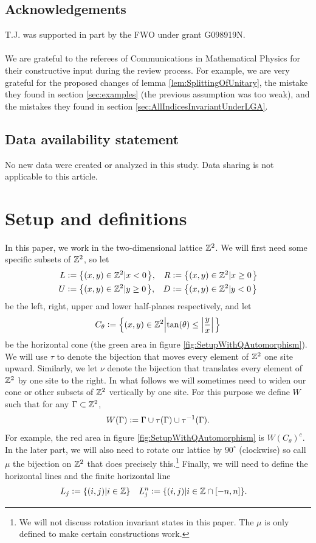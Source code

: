 \documentclass[11pt,a4paper,twoside]{article}
\numberwithin{equation}{section}
\begin{document}
	\subsection*{Acknowledgements}
	T.J. was supported in part by the FWO under grant G098919N.\\\\
	We are grateful to the referees of Communications in Mathematical Physics for their constructive input during the review process. For example, we are very grateful for the proposed changes of lemma \ref{lem:SplittingOfUnitary}, the mistake they found in section \ref{sec:examples} (the previous assumption was too weak), and the mistakes they found in section \ref{sec:AllIndicesInvariantUnderLGA}.
	\subsection*{Data availability statement}
	No new data were created or analyzed in this study. Data sharing is not applicable to this article.
	\section{Setup and definitions}\label{sec:Setup}
	In this paper, we work in the two-dimensional lattice $\mathbb Z^2$. We will first need some specific subsets of $\mathbb Z^2$, so let
	\begin{align}
		L&\defeq \left\{(x,y)\in\ZZ^2\left|x<0\right.\right\},&R&\defeq \left\{(x,y)\in\ZZ^2\left|x\geq 0\right.\right\}\\
		U&\defeq \left\{(x,y)\in\ZZ^2\left|y\geq 0\right.\right\},&D&\defeq \left\{(x,y)\in\ZZ^2\left|y<0\right.\right\}
	\end{align}
	be the left, right, upper and lower half-planes respectively, and let
	\begin{equation}
		C_\theta\defeq \left\{(x,y)\in\ZZ^2\left|\tan(\theta)\leq\abs{\frac{y}{x}}\right.\right\}
	\end{equation}
	be the horizontal cone (the green area in figure \ref{fig:SetupWithQAutomorphism}). We will use $\tau$ to denote the bijection that moves every element of $\mathbb Z^2$ one site upward. Similarly, we let $\nu$ denote the bijection that translates every element of $\mathbb Z^2$ by one site to the right. In what follows we will sometimes need to widen our cone or other subsets of $\mathbb Z^2$ vertically by one site. For this purpose we define $W$ such that for any $\Gamma\subset\mathbb Z^2$,
	\begin{equation}
		W(\Gamma)\vcentcolon= \Gamma\cup\tau(\Gamma)\cup\tau^{-1}(\Gamma).
	\end{equation}
	For example, the red area in figure \ref{fig:SetupWithQAutomorphism} is $W(C_\theta)^c$. In the later part, we will also need to rotate our lattice by $90^\circ$ (clockwise) so call $\mu$ the bijection on $\mathbb Z^2$ that does precisely this.\footnote{We will not discuss rotation invariant states in this paper. The $\mu$ is only defined to make certain constructions work.} Finally, we will need to define the horizontal lines and the finite horizontal line
	\begin{align}
		L_j&\vcentcolon= \{(i,j)|i\in\mathbb Z\}&L_j^n&\vcentcolon= \{(i,j)|i\in\mathbb Z\cap[-n,n]\}.
	\end{align}
\end{document}
